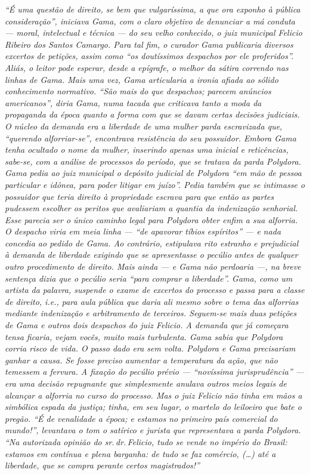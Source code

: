 \begin{didascalia}
\emph{``É uma questão de direito, se bem que vulgaríssima, a que ora
exponho à pública consideração'', iniciava Gama, com o claro objetivo de
denunciar a má conduta --- moral, intelectual e técnica --- do seu velho
conhecido, o juiz municipal Felicio Ribeiro dos Santos Camargo. Para tal
fim, o curador Gama publicaria diversos excertos de petições, assim como
``os doutíssimos despachos por ele proferidos''. Aliás, o leitor pode
esperar, desde a epígrafe, o melhor da sátira correndo nas linhas de
Gama. Mais uma vez, Gama articularia a ironia afiada ao sólido
conhecimento normativo. ``São mais do que despachos; parecem anúncios
americanos'', diria Gama, numa tacada que criticava tanto a moda da
propaganda da época quanto a forma com que se davam certas decisões
judiciais. O núcleo da demanda era a liberdade de uma mulher parda
escravizada que, ``querendo alforriar-se'', encontrava resistência do seu
possuidor. Embora Gama tenha ocultado o nome da mulher, inserindo apenas
uma inicial e reticências, sabe-se, com a análise de processos do
período, que se tratava da parda Polydora. Gama pedia ao juiz municipal
o depósito judicial de Polydora ``em mão de pessoa particular e idônea,
para poder litigar em juízo''. Pedia também que se intimasse o possuidor
que teria direito à propriedade escrava para que então as partes
pudessem escolher os peritos que avaliariam a quantia da indenização
senhorial. Esse parecia ser o único caminho legal para Polydora obter
enfim a sua alforria. O despacho viria em meia linha --- ``de apavorar
tíbios espíritos'' --- e nada concedia ao pedido de Gama. Ao contrário,
estipulava rito estranho e prejudicial à demanda de liberdade exigindo
que se apresentasse o pecúlio antes de qualquer outro procedimento de
direito. Mais ainda --- e Gama não perdoaria ---, na breve sentença dizia
que o pecúlio seria ``para comprar a liberdade''. Gama, como um artista da
palavra, suspende o exame de excertos do processo e passa para a classe
de direito, i.e., para aula pública que daria ali mesmo sobre o tema das
alforrias mediante indenização e arbitramento de terceiros. Seguem-se
mais duas petições de Gama e outros dois despachos do juiz Felicio. A
demanda que já começara tensa ficaria, vejam vocês, muito mais
turbulenta. Gama sabia que Polydora corria risco de vida. O passo dado
era sem volta. Polydora e Gama precisariam ganhar a causa. Se fosse
preciso aumentar a temperatura da ação, que não temessem a fervura. A
fixação do pecúlio prévio --- ``novíssima jurisprudência'' --- era uma
decisão repugnante que simplesmente anulava outros meios legais de
alcançar a alforria no curso do processo. Mas o juiz Felicio não tinha
em mãos a simbólica espada da justiça; tinha, em seu lugar, o martelo do
leiloeiro que bate o pregão. ``É de venalidade a época; e estamos no
primeiro país comercial do mundo!'', levantava o tom o satírico e jurista
que representava a parda Polydora. ``Na autorizada opinião do sr.\,dr.\,Felicio, tudo se vende no império do Brasil: estamos em contínua e plena
barganha: de tudo se faz comércio, (\ldots{}) até a liberdade, que se compra
perante certos magistrados!''}
\end{didascalia}

